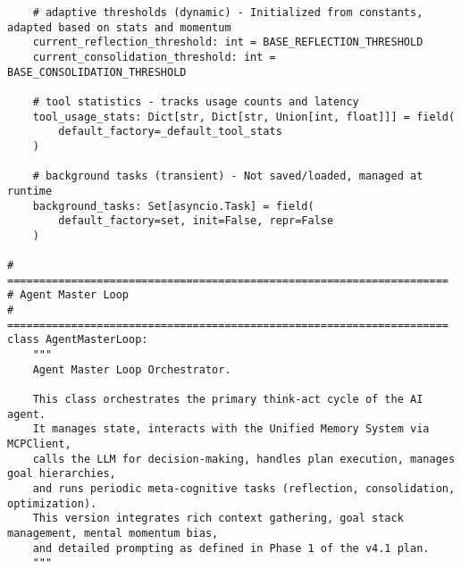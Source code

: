 \documentclass[12pt,a4paper]{article}
\begin{document}
\begin{pageablecode}
\begin{verbatim}
    # adaptive thresholds (dynamic) - Initialized from constants, adapted based on stats and momentum
    current_reflection_threshold: int = BASE_REFLECTION_THRESHOLD
    current_consolidation_threshold: int = BASE_CONSOLIDATION_THRESHOLD

    # tool statistics - tracks usage counts and latency
    tool_usage_stats: Dict[str, Dict[str, Union[int, float]]] = field(
        default_factory=_default_tool_stats
    )

    # background tasks (transient) - Not saved/loaded, managed at runtime
    background_tasks: Set[asyncio.Task] = field(
        default_factory=set, init=False, repr=False
    )

# =====================================================================
# Agent Master Loop
# =====================================================================
class AgentMasterLoop:
    """
    Agent Master Loop Orchestrator.

    This class orchestrates the primary think-act cycle of the AI agent.
    It manages state, interacts with the Unified Memory System via MCPClient,
    calls the LLM for decision-making, handles plan execution, manages goal hierarchies,
    and runs periodic meta-cognitive tasks (reflection, consolidation, optimization).
    This version integrates rich context gathering, goal stack management, mental momentum bias,
    and detailed prompting as defined in Phase 1 of the v4.1 plan.
    """


\end{verbatim}
\end{pageablecode}
\end{document}

